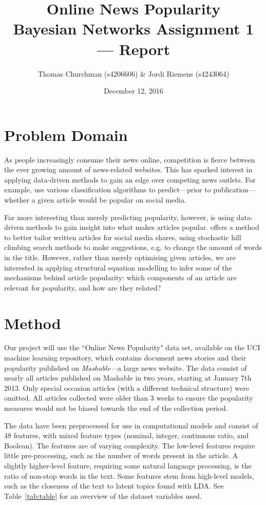 \documentclass{article}
\title{Online News Popularity \\\large Bayesian Networks Assignment 1 --- Report}
\author{Thomas Churchman (s4206606) \& Jordi Riemens (s4243064)}
\date{December 12, 2016}
\begin{document}
\maketitle

\section{Problem Domain}
As people increasingly consume their news online, competition is fierce between the ever growing amount of news-related websites. This has sparked interest in applying data-driven methods to gain an edge over competing news outlets. For example, \citet{fernandes2015proactive} use various classification algorithms to predict---prior to publication---whether a given article would be popular on social media.

Far more interesting than merely predicting popularity, however, is using data-driven methods to gain insight into what makes articles popular. \citet{fernandes2015proactive} offers a method to better tailor written articles for social media shares, using stochastic hill climbing search methods to make suggestions, e.g. to change the amount of words in the title. However, rather than merely optimising given articles, we are interested in applying structural equation modelling to infer some of the mechanisms behind article popularity: which components of an article are relevant for popularity, and how are they related?


\section{Method}
Our project will use the ``Online News Popularity" data set, available on the UCI machine learning repository, which contains document news stories and their popularity published on \emph{Mashable}---a large news website.
The data consist of nearly all articles published on Mashable in two years, starting at January 7th 2013.
Only special occasion articles (with a different technical structure) were omitted.
All articles collected were older than 3 weeks to ensure the popularity measures would not be biased towards the end of the collection period.

The data have been preprocessed for use in computational models and consist of 48 features, with mixed feature types (nominal, integer, continuous ratio, and Boolean).
The features are of varying complexity. The low-level features require little pre-processing, such as the number of words present in the article.
A slightly higher-level feature, requiring some natural language processing, is the ratio of non-stop words in the text.
Some features stem from high-level models, such as the closeness of the text to latent topics found with LDA.
See Table~\ref{tab:table} for an overview of the dataset variables used.
\end{document}
